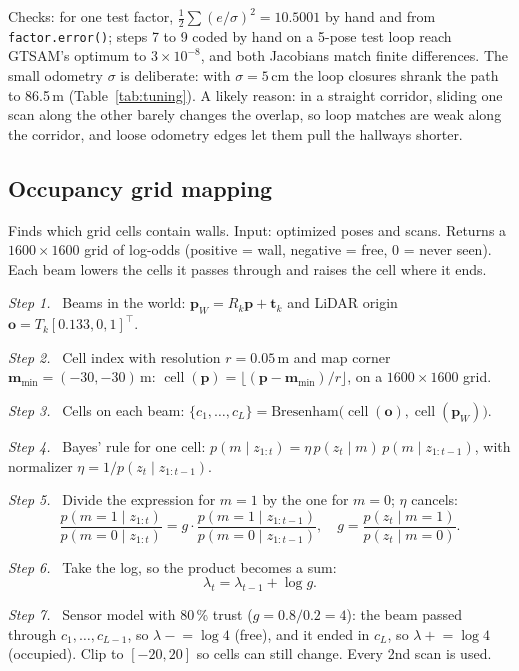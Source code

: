 \documentclass[letterpaper, 10pt, conference]{ieeeconf}
\newcommand{\code}[1]{\texttt{#1}}
\newcommand{\p}{\mathbf{p}}
\newcommand{\tb}{\mathbf{t}}
\newcommand{\step}[1]{\par\noindent\textit{Step #1.}\ }
\newcommand{\summary}[1]{#1\par}
\begin{document}
Checks: for one test factor, $\tfrac12\sum(e/\sigma)^2=10.5001$ by hand and
from \code{factor.error()}; steps 7 to 9 coded by hand on a 5-pose test loop
reach GTSAM's optimum to $3\times10^{-8}$, and both Jacobians match finite
differences. The small odometry $\sigma$ is deliberate: with $\sigma=5$\,cm
the loop closures shrank the path to 86.5\,m (Table~\ref{tab:tuning}). A
likely reason: in a straight corridor, sliding one scan along the other
barely changes the overlap, so loop matches are weak along the corridor,
and loose odometry edges let them pull the hallways shorter.

\subsection{Occupancy grid mapping}

\summary{Finds which grid cells contain walls. Input: optimized poses and
scans. Returns a $1600\times1600$ grid of log-odds (positive = wall, negative
= free, 0 = never seen). Each beam lowers the cells it passes through and
raises the cell where it ends.}

\step{1} Beams in the world: $\p_W=R_k\p+\tb_k$ and LiDAR origin
$\mathbf{o}=T_k[0.133,0,1]^\top$.

\step{2} Cell index with resolution $r=0.05$\,m and map corner $\mathbf{m}_{\min}=(-30,-30)$\,m:
$\operatorname{cell}(\p)=\lfloor(\p-\mathbf{m}_{\min})/r\rfloor$, on a $1600\times1600$ grid.

\step{3} Cells on each beam: $\{c_1,\dots,c_L\}=\text{Bresenham}\big(\operatorname{cell}(\mathbf{o}),\operatorname{cell}(\p_W)\big)$.

\step{4} Bayes' rule for one cell:
$p(m\mid z_{1:t})=\eta\,p(z_t\mid m)\,p(m\mid z_{1:t-1})$, with normalizer $\eta=1/p(z_t\mid z_{1:t-1})$.

\step{5} Divide the expression for $m=1$ by the one for $m=0$; $\eta$ cancels:
\begin{equation}
\frac{p(m{=}1\mid z_{1:t})}{p(m{=}0\mid z_{1:t})}
=g\cdot\frac{p(m{=}1\mid z_{1:t-1})}{p(m{=}0\mid z_{1:t-1})},\quad
g=\frac{p(z_t\mid m{=}1)}{p(z_t\mid m{=}0)}.
\end{equation}

\step{6} Take the log, so the product becomes a sum:
\begin{equation}
\lambda_t=\lambda_{t-1}+\log g .
\end{equation}

\step{7} Sensor model with 80\,\% trust ($g=0.8/0.2=4$): the beam passed
through $c_1,\dots,c_{L-1}$, so $\lambda\mathrel{-}=\log4$ (free), and it ended
in $c_L$, so $\lambda\mathrel{+}=\log4$ (occupied). Clip to $[-20,20]$ so cells
can still change. Every 2nd scan is used.
\end{document}
